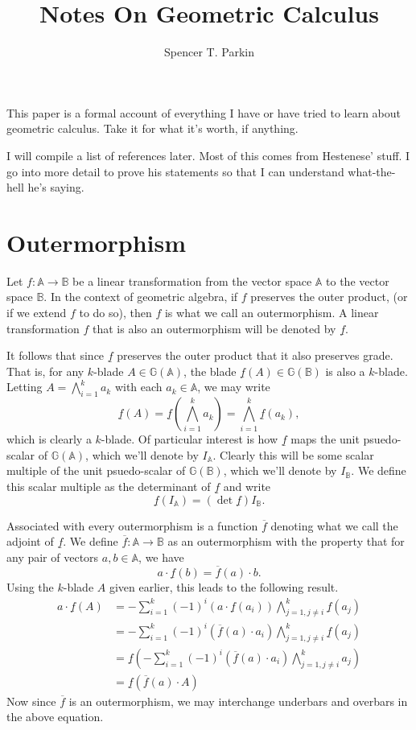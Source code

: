 \documentclass[12pt]{article}
\title{Notes On Geometric Calculus}
\author{Spencer T. Parkin}
\newcommand{\G}{\mathbb{G}}
\newcommand{\A}{\mathbb{A}}
\newcommand{\B}{\mathbb{B}}
\newcommand{\ob}{\overline}
\newcommand{\ub}{\underline}
\begin{document}
\maketitle

This paper is a formal account of everything I have or have tried
to learn about geometric calculus.  Take it for what it's worth, if anything.

I will compile a list of references later.  Most of this comes from Hestenese' stuff.
I go into more detail to prove his statements so that I can understand what-the-hell
he's saying.

\section{Outermorphism}

Let $f:\A\to\B$ be a linear transformation from the vector space $\A$
to the vector space $\B$.  In the context of geometric algebra, if $f$
preserves the outer product, (or if we extend $f$ to do so), then $f$
is what we call an outermorphism.  A linear transformation $f$ that is
also an outermorphism will be denoted by $\ub{f}$.

It follows that since $\ub{f}$ preserves the outer product
that it also preserves grade.  That is, for any $k$-blade $A\in\G(\A)$,
the blade $\ub{f}(A)\in\G(\B)$ is also a $k$-blade.  Letting $A=\bigwedge_{i=1}^k a_k$ with
each $a_k\in\A$, we may write
\begin{equation*}
\ub{f}(A)=\ub{f}\left(\bigwedge_{i=1}^k a_k\right) = \bigwedge_{i=1}^k\ub{f}(a_k),
\end{equation*}
which is clearly a $k$-blade.  Of particular interest is how $\ub{f}$ maps the
unit psuedo-scalar of $\G(\A)$, which we'll denote by $I_{\A}$.  Clearly this
will be some scalar multiple of the unit psuedo-scalar of $\G(\B)$, which we'll
denote by $I_{\B}$.  We define this scalar multiple as the determinant of $\ub{f}$
and write
\begin{equation*}
\ub{f}(I_{\A}) = \left(\det\ub{f}\right)I_{\B}.
\end{equation*}

Associated with every outermorphism is a function $\ob{f}$ denoting what we call
the adjoint of $\ub{f}$.  We define $\ob{f}:\A\to\B$ as an outermorphism
with the property that for any pair of vectors $a,b\in\A$, we have
\begin{equation*}
a\cdot \ub{f}(b) = \ob{f}(a)\cdot b.
\end{equation*}
Using the $k$-blade $A$ given earlier, this leads to the following result.
\begin{align*}
a\cdot \ub{f}(A) &= -\sum_{i=1}^k(-1)^i(a\cdot\ub{f}(a_i))\bigwedge_{j=1,j\neq i}^k\ub{f}(a_j) \\
 &= -\sum_{i=1}^k(-1)^i(\ob{f}(a)\cdot a_i)\bigwedge_{j=1,j\neq i}^k\ub{f}(a_j) \\
 &= \ub{f}\left(-\sum_{i=1}^k(-1)^i(\ob{f}(a)\cdot a_i)\bigwedge_{j=1,j\neq i}^k a_j\right) \\
 &= \ub{f}(\ob{f}(a)\cdot A)
\end{align*}
Now since $\ob{f}$ is an outermorphism, we may interchange underbars and overbars
in the above equation.
\end{document}
